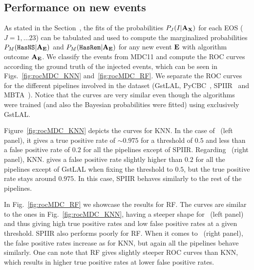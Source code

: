 \subsection{Performance on new events}

As stated in the Section~, the fits of the probabilities
$P_J(I|{\bf A}_{\bf X})$ for each EOS ($J=1,\dots 23$) can be tabulated and
used to compute the marginalized probabilities $P_M({{\tt HasNS}}|{\bf A}_{\bf E})$
and $P_M({{\tt HasRem}}|{\bf A}_{\bf E})$ for any new event $\bf E$ with algorithm
outcome $\bf A_{E}$.  We classify the events from MDC11  and compute the ROC curves according the ground truth of
the injected events, which can be seen in Figs.~\ref{fig:rocMDC_KNN}
and~\ref{fig:rocMDC_RF}. We separate the ROC curves for the different pipelines
involved in the dataset (GstLAL,  PyCBC~\cite{pycbc:2016},
SPIIR~\cite{spiir:2020} and MBTA~\cite{mbta:2016}). Notice that the curves are very similar even though the algorithms were trained (and also the Bayesian probabilities were fitted) using exclusively GstLAL.

Figure~\ref{fig:rocMDC_KNN} depicts the curves for \ac{KNN}.  In the case of
\hasns\ (left panel), it gives a true positive rate of $\sim 0.975$ for a
threshold of $0.5$ and less than a false positive rate of $0.2$ for all the
pipelines except of SPIIR. Regarding \hasrem\ (right panel), \ac{KNN}. gives a
false positive rate slightly higher than $0.2$ for all the pipelines except of
GstLAL when fixing the threshold to $0.5$, but the true positive rate stays
around $0.975$. In this case, SPIIR behaves similarly to the rest of the pipelines.  

In Fig.~\ref{fig:rocMDC_RF} we showcase the results for \ac{RF}.  The curves
are similar to the ones in Fig.~\ref{fig:rocMDC_KNN}, having a steeper shape for \hasns\ (left panel) and thus giving high true positive rates and low false positive rates at a given threshold. SPIIR also performs poorly for \ac{RF}. When it comes to \hasrem\ (right panel), the false positive rates increase as for \ac{KNN}, but again all the pipelines behave similarly. One can note that \ac{RF} gives slightly steeper ROC curves than \ac{KNN},  which results in higher true positive rates at lower false positive rates. 


